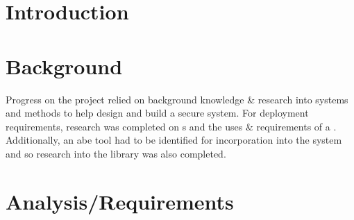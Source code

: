 \documentclass[british]{l4proj}
\begin{document}
\newcommand{\thePolicyLang}{\textsc{PolLang}\textsubscript{ABE}\xspace}
\newcommand{\theResServer}{\textsc{ResSrvr}\textsubscript{ABE}\xspace}
\newcommand{\OpenABE}{\textsc{OpenABE}\xspace}
\newcommand{\PyOpenABE}{\textsc{PyOpenABE}\xspace}

\chapter{Introduction}
\label{ch:introduction}











\chapter{Background}
\label{ch:background}

Progress on the project relied on background knowledge \& research into  systems and  methods to help design and build a secure system. For deployment requirements, research was completed on s and the uses \& requirements of a . Additionally, an \acrshort{abe} tool had to be identified for incorporation into the system and so research into the  library was also completed.











\chapter{Analysis/Requirements}
\label{ch:analysis}
\end{document}
